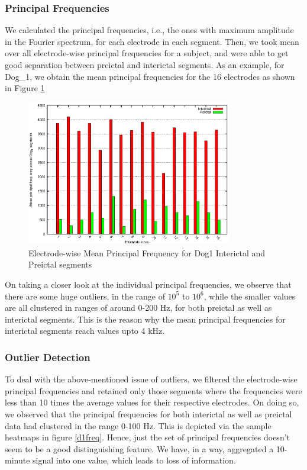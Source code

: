 \documentclass[a4paper]{article}
\begin{document}
\subsubsection{Principal Frequencies}
We calculated the principal frequencies, i.e., the ones with maximum amplitude in the Fourier spectrum, for each electrode in each segment. Then, we took mean over all electrode-wise principal frequencies for a subject, and were able to get good separation between preictal and interictal segments. As an example, for Dog\_1, we obtain the mean principal frequencies for the 16 electrodes as shown in Figure  \ref{fig:d1prin}

\begin{figure}
  \centering
   \includegraphics[width=0.8\textwidth]{dog1principalfreqs.eps}
  \caption{Electrode-wise Mean Principal Frequency for Dog1 Interictal and Preictal segments}
  \label{fig:d1prin}
\end{figure}
On taking a closer look at the individual principal frequencies, we observe that there are some huge outliers, in the range of $10^{5}$ to $10^{6}$, while the smaller values are all clustered in ranges of around 0-200 Hz, for both preictal as well as interictal segments. This is the reason why the mean principal frequencies for interictal segments reach values upto 4 kHz.

\subsubsection{Outlier Detection}
To deal with the above-mentioned issue of outliers, we filtered the electrode-wise principal frequencies and retained only those segments where the frequencies were less than 10 times the average values for their respective electrodes. On doing so, we observed that the principal frequencies for both interictal as well as preictal data had clustered in the range 0-100 Hz. This is depicted via the sample heatmaps in figure \ref{d1freq}. Hence, just the set of principal frequencies doesn't seem to be a good distinguishing feature. We have, in a way, aggregated a 10-minute signal into one value, which leads to loss of information.
\end{document}
